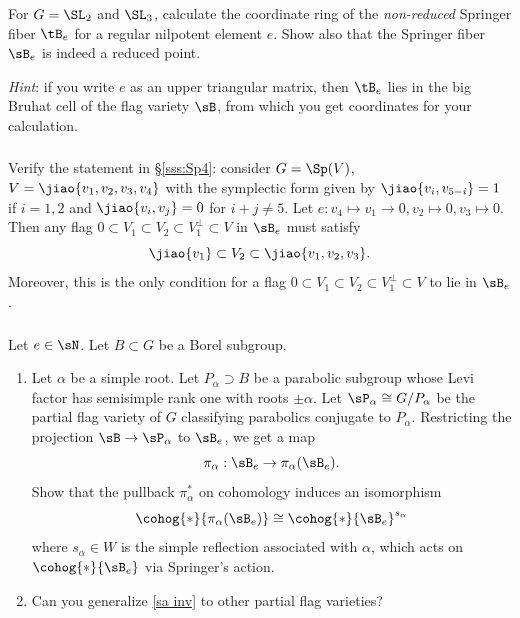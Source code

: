 \subsubsection{}\label{exI:nonred Spr} For $G=\SL_{2}$ and $\SL_{3}$, calculate the coordinate ring of the {\em non-reduced} Springer fiber $\tB_{e}$ for a regular nilpotent element $e$. Show also that the Springer fiber $\sB_{e}$ is indeed a reduced point. 

{\em Hint}: if you write $e$ as an upper triangular matrix, then $\tB_{e}$ lies in the big Bruhat cell of the flag variety $\sB$, from which you get coordinates for your calculation.


\subsubsection{}\label{exI:211Sp4} Verify the statement in \S\ref{sss:Sp4}: consider $G=\Sp(V)$, $V=\jiao{v_{1},v_{2},v_{3},v_{4}}$ with the symplectic form given by $\jiao{v_{i},v_{5-i}}=1$ if $i=1,2$ and $\jiao{v_{i},v_{j}}=0$ for $i+j\neq 5$. Let $e: v_{4}\mapsto v_{1}\to 0, v_{2}\mapsto 0,v_{3}\mapsto 0$. Then any flag $0\subset V_{1}\subset V_{2}\subset V_{1}^{\bot}\subset V$ in $\sB_{e}$ must satisfy
\begin{equation*}
\jiao{v_{1}}\subset V_{2}\subset\jiao{v_{1},v_{2},v_{3}}.
\end{equation*}
Moreover, this is the only condition for a flag $0\subset V_{1}\subset V_{2}\subset V_{1}^{\bot}\subset V$ to lie in $\sB_{e}$.


\subsubsection{}\label{exI:inv} Let $e\in\sN$.  Let $B\subset G$ be a Borel subgroup.
\begin{enumerate}
\item  Let $\alpha$ be a simple root. Let $P_{\alpha}\supset B$ be a parabolic subgroup whose Levi factor has semisimple rank one with roots $\pm\alpha$. Let $\sP_{\alpha}\cong G/P_{\alpha}$ be the partial flag variety of $G$ classifying parabolics conjugate to $P_{\alpha}$. Restricting the projection $\sB\to \sP_{\alpha}$  to $\sB_{e}$, we get a map
\begin{equation*}
\pi_{\alpha}: \sB_{e}\to \pi_{\alpha}(\sB_{e}).
\end{equation*}
Show that the pullback $\pi^{*}_{\alpha}$ on cohomology induces an isomorphism
\begin{equation}\label{sa inv}
\cohog{*}{\pi_{\alpha}(\sB_{e})}\cong \cohog{*}{\sB_{e}}^{s_{\alpha}}
\end{equation}
where $s_{\alpha}\in W$ is the simple reflection associated with $\alpha$, which acts on $\cohog{*}{\sB_{e}}$ via Springer's action.
\item Can you generalize \eqref{sa inv} to other partial flag varieties?
\end{enumerate}


